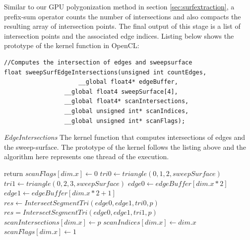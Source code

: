 Similar to our GPU polygonization method in section \ref{sec:surfextraction}, a prefix-sum operator counts the number
of intersections and also compacts the resulting array of intersection points. The final output of this stage is a list
of intersection points and the associated edge indices. Listing below shows the prototype of the kernel function in 
OpenCL:

\begin{lstlisting}[frame=single]
//Computes the intersection of edges and sweepsurface
float sweepSurfEdgeIntersections(unsigned int countEdges,
			         __global float4* edgeBuffer,
				 __global float4 sweepSurface[4],
				 __global float4* scanIntersections,
				 __global unsigned int* scanIndices,
				 __global unsigned int* scanFlags);
\end{lstlisting}
		     
\begin{algorithm}[H]
\caption{\textit{EdgeIntersections} The kernel function that computes intersections of edges 
and the sweep-surface. The prototype of the kernel follows the listing above and the algorithm here represents one 
thread of the execution. }
\label{alg:edgeIntersections}
\begin{algorithmic}[1]	
  \STATE return
  \ENDIF
  \STATE $scanFlags[dim.x] \gets 0$
  \STATE $tri0 \gets triangle(0, 1, 2, sweepSurface)$
  \STATE $tri1 \gets triangle(0, 2, 3, sweepSurface)$
  \STATE $edge0 \gets edgeBuffer[dim.x * 2]$
  \STATE $edge1 \gets edgeBuffer[dim.x * 2 + 1]$
  \STATE $res \gets IntersectSegmentTri(edge0, edge1, tri0, p)$
  \STATE $res = IntersectSegmentTri(edge0, edge1, tri1, p)$
  \ENDIF
  \STATE $scanIntersections[dim.x] \gets p$
  \STATE $scanIndices[dim.x] \gets dim.x$
  \STATE $scanFlags[dim.x] \gets 1$
  \ENDIF
  
\end{algorithmic}
\end{algorithm}



